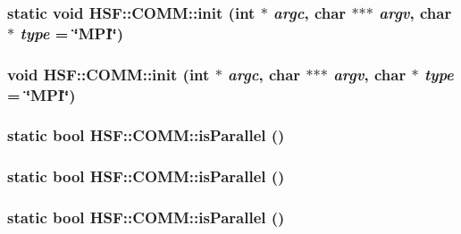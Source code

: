 \label{classHSF_1_1COMM_a4e1c8c801a57bb3f57e78e89ecbe98a4}
\hypertarget{classHSF_1_1COMM_a4e1c8c801a57bb3f57e78e89ecbe98a4}{
\subsubsection[{init}]{\setlength{\rightskip}{0pt plus 5cm}static void HSF::COMM::init (int $\ast$ {\em argc}, \/  char $\ast$$\ast$$\ast$ {\em argv}, \/  char $\ast$ {\em type} = {\ttfamily \char`\"{}MPI\char`\"{}})}}
\label{classHSF_1_1COMM_a4e1c8c801a57bb3f57e78e89ecbe98a4}
\hypertarget{classHSF_1_1COMM_a7132936c593ca869e3cf2ab967ea187e}{
\subsubsection[{init}]{\setlength{\rightskip}{0pt plus 5cm}void HSF::COMM::init (int $\ast$ {\em argc}, \/  char $\ast$$\ast$$\ast$ {\em argv}, \/  char $\ast$ {\em type} = {\ttfamily \char`\"{}MPI\char`\"{}})}}
\label{classHSF_1_1COMM_a7132936c593ca869e3cf2ab967ea187e}
\hypertarget{classHSF_1_1COMM_ad97b577f23c1a1f9f72d8d84b497e2c2}{
\subsubsection[{isParallel}]{\setlength{\rightskip}{0pt plus 5cm}static bool HSF::COMM::isParallel ()}}
\label{classHSF_1_1COMM_ad97b577f23c1a1f9f72d8d84b497e2c2}
\hypertarget{classHSF_1_1COMM_ad97b577f23c1a1f9f72d8d84b497e2c2}{
\subsubsection[{isParallel}]{\setlength{\rightskip}{0pt plus 5cm}static bool HSF::COMM::isParallel ()}}
\label{classHSF_1_1COMM_ad97b577f23c1a1f9f72d8d84b497e2c2}
\hypertarget{classHSF_1_1COMM_ad97b577f23c1a1f9f72d8d84b497e2c2}{
\subsubsection[{isParallel}]{\setlength{\rightskip}{0pt plus 5cm}static bool HSF::COMM::isParallel ()}}
